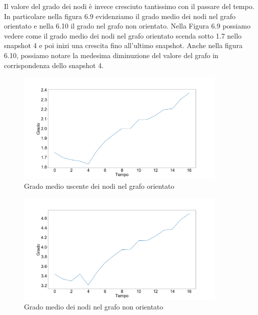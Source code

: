 \documentclass[12pt]{report}
\begin{document}
Il valore del grado dei nodi è invece cresciuto tantissimo con il passare del tempo. 
In particolare nella figura 6.9 evidenziamo il grado medio dei nodi nel grafo orientato e nella 6.10 il grado nel grafo non orientato.
Nella Figura 6.9 possiamo vedere come il grado medio dei nodi nel grafo orientato scenda sotto 1.7 nello snapshot 4 e poi inizi una crescita fino all'ultimo snapshot.
Anche nella figura 6.10, possiamo notare la medesima diminuzione del valore del grafo in corrispondenza dello snapshot 4.


\begin{figure}[H]

\centering\includegraphics[width=0.9\textwidth]{GradoMedio.png}
\caption{Grado medio uscente dei nodi nel grafo orientato}

\end{figure}


\begin{figure}[H]

\centering\includegraphics[width=0.9\textwidth]{GradoMedioUndir.png}
\caption{Grado medio dei nodi nel grafo non orientato}

\end{figure}
\end{document}
